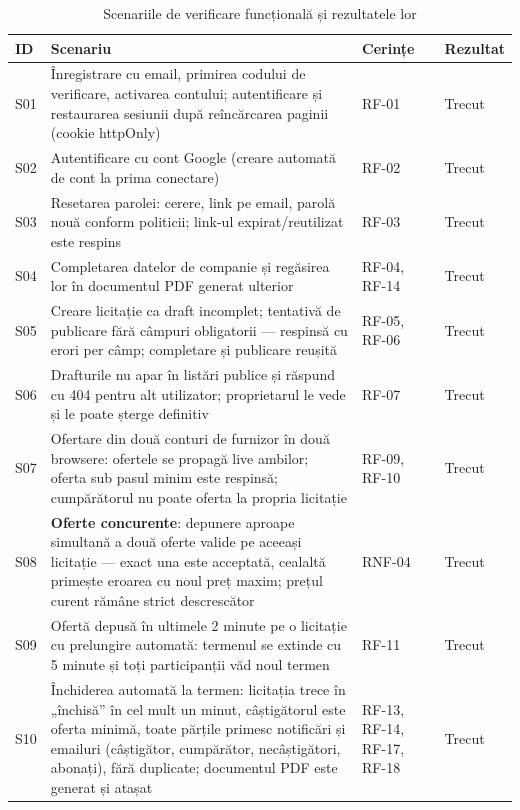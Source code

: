 \begin{table}[!ht]\footnotesize\linespread{1}
\centering
\caption{Scenariile de verificare funcțională și rezultatele lor}
\label{tab:scenarii}
\begin{tabular}{l >{\raggedright\arraybackslash}p{9.6cm} l l}
\toprule
\textbf{ID} & \textbf{Scenariu} & \textbf{Cerințe} & \textbf{Rezultat} \\
\midrule
S01 & Înregistrare cu email, primirea codului de verificare, activarea contului; autentificare și restaurarea sesiunii după reîncărcarea paginii (cookie httpOnly) & RF-01 & Trecut \\
S02 & Autentificare cu cont Google (creare automată de cont la prima conectare) & RF-02 & Trecut \\
S03 & Resetarea parolei: cerere, link pe email, parolă nouă conform politicii; link-ul expirat/reutilizat este respins & RF-03 & Trecut \\
S04 & Completarea datelor de companie și regăsirea lor în documentul PDF generat ulterior & RF-04, RF-14 & Trecut \\
S05 & Creare licitație ca draft incomplet; tentativă de publicare fără câmpuri obligatorii --- respinsă cu erori per câmp; completare și publicare reușită & RF-05, RF-06 & Trecut \\
S06 & Drafturile nu apar în listări publice și răspund cu 404 pentru alt utilizator; proprietarul le vede și le poate șterge definitiv & RF-07 & Trecut \\
S07 & Ofertare din două conturi de furnizor în două browsere: ofertele se propagă live ambilor; oferta sub pasul minim este respinsă; cumpărătorul nu poate oferta la propria licitație & RF-09, RF-10 & Trecut \\
S08 & \textbf{Oferte concurente}: depunere aproape simultană a două oferte valide pe aceeași licitație --- exact una este acceptată, cealaltă primește eroarea cu noul preț maxim; prețul curent rămâne strict descrescător & RNF-04 & Trecut \\
S09 & Ofertă depusă în ultimele 2 minute pe o licitație cu prelungire automată: termenul se extinde cu 5 minute și toți participanții văd noul termen & RF-11 & Trecut \\
S10 & Închiderea automată la termen: licitația trece în „închisă'' în cel mult un minut, câștigătorul este oferta minimă, toate părțile primesc notificări și emailuri (câștigător, cumpărător, necâștigători, abonați), fără duplicate; documentul PDF este generat și atașat & RF-13, RF-14, RF-17, RF-18 & Trecut \\

\end{tabular}
\end{table}

